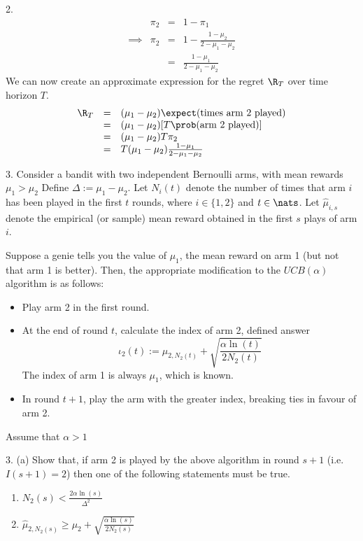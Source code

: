 \documentclass[11pt,a4paper]{article}
\begin{document}
\begin{answer}{2.}
\[\begin{array}{rrcl}
    &\pi_2&=&1-\pi_1\\
    \implies&\pi_2&=&1-\frac{1-\mu_2}{2-\mu_1-\mu_2}\\
    &&=&\frac{1-\mu_1}{2-\mu_1-\mu_2}
  \end{array}\]
  We can now create an approximate expression for the regret $\R_T$ over time horizon $T$.
  \[\begin{array}{rcl}
    \R_T&=&(\mu_1-\mu_2)\expect(\text{times arm 2 played})\\
    &=&(\mu_1-\mu_2)[T\prob(\text{arm 2 played})]\\
    &=&(\mu_1-\mu_2)T\pi_2\\
    &=&T(\mu_1-\mu_2)\frac{1-\mu_1}{2-\mu_1-\mu_2}
  \end{array}\]
\end{answer}

\begin{question}{3.}
  Consider a bandit with two independent Bernoulli arms, with mean rewards $\mu_1>\mu_2$ Define $\Delta:=\mu_1-\mu_2$. Let $N_i(t)$ denote the number of times that arm $i$ has been played in the first $t$ rounds, where $i\in\{1,2\}$ and $t\in\nats$. Let  $\hat\mu_{i,s}$ denote the empirical (or sample) mean reward obtained in the first $s$ plays of arm $i$.
  \par Suppose a genie tells you the value of $\mu_1$, the mean reward on arm 1 (but not that arm 1 is better). Then, the appropriate modification to the $UCB(\alpha)$ algorithm is as follows:
  \begin{itemize}
    \item Play arm 2 in the first round.
    \item At the end of round $t$, calculate the index of arm 2, defined answer
    \[ \iota_2(t):=\hat\mu_{2,N_2(t)}+\sqrt{\frac{\alpha\ln(t)}{2N_2(t)}} \]
    The index of arm 1 is always $\mu_1$, which is known.
    \item In round $t+1$, play the arm with the greater index, breaking ties in favour of arm 2.
  \end{itemize}
  Assume that $\alpha>1$
\end{question}

\begin{question}{3. (a)}
  Show that, if arm 2 is played by the above algorithm in round $s+1$ (i.e. $I(s+1)=2$) then one of the following statements must be true.
  \begin{enumerate}
    \item $\displaystyle N_2(s)<\frac{2\alpha\ln(s)}{\Delta^2}$
    \item $\displaystyle\hat\mu_{2,N_2(s)}\geq\mu_2+\sqrt{\frac{\alpha\ln(s)}{2N_2(s)}}$
  \end{enumerate}
\end{question}
\end{document}
